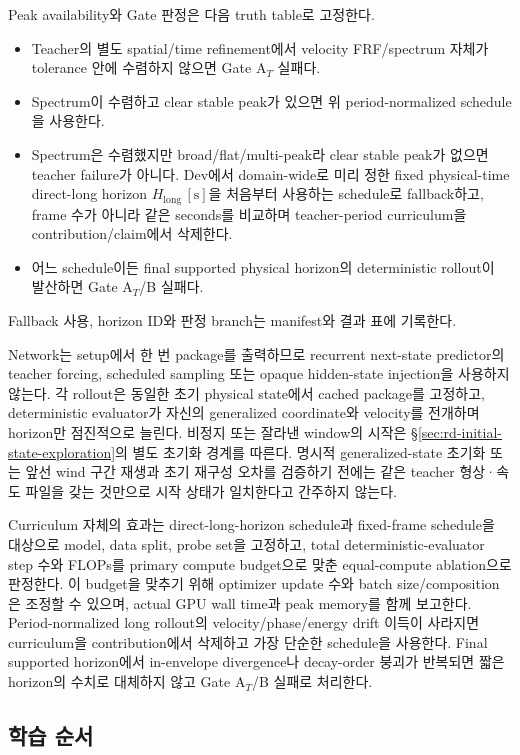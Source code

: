 \documentclass[11pt]{article}
\begin{document}
Peak availability와 Gate 판정은 다음 truth table로 고정한다.
\begin{itemize}
  \item Teacher의 별도 spatial/time refinement에서 velocity FRF/spectrum 자체가 tolerance 안에
  수렴하지 않으면 Gate A\(_T\) 실패다.
  \item Spectrum이 수렴하고 clear stable peak가 있으면 위 period-normalized schedule을 사용한다.
  \item Spectrum은 수렴했지만 broad/flat/multi-peak라 clear stable peak가 없으면 teacher failure가 아니다.
  Dev에서 domain-wide로 미리 정한 fixed physical-time direct-long horizon
  \(H_{\mathrm{long}}\,[\mathrm s]\)을 처음부터 사용하는 schedule로 fallback하고,
  frame 수가 아니라 같은 seconds를 비교하며
  teacher-period curriculum을 contribution/claim에서 삭제한다.
  \item 어느 schedule이든 final supported physical horizon의 deterministic rollout이 발산하면
  Gate A\(_T\)/B 실패다.
\end{itemize}
Fallback 사용, horizon ID와 판정 branch는 manifest와 결과 표에 기록한다.

Network는 setup에서 한 번 package를 출력하므로 recurrent next-state predictor의 teacher forcing,
scheduled sampling 또는 opaque hidden-state injection을 사용하지 않는다. 각 rollout은 동일한 초기
physical state에서 cached package를 고정하고, deterministic evaluator가 자신의 generalized coordinate와
velocity를 전개하며 horizon만 점진적으로 늘린다.
비정지 또는 잘라낸 window의 시작은 \S\ref{sec:rd-initial-state-exploration}의 별도 초기화 경계를 따른다.
명시적 generalized-state 초기화 또는 앞선 wind 구간 재생과 초기 재구성 오차를 검증하기 전에는
같은 teacher 형상·속도 파일을 갖는 것만으로 시작 상태가 일치한다고 간주하지 않는다.

Curriculum 자체의 효과는 direct-long-horizon schedule과 fixed-frame schedule을 대상으로 model, data split,
probe set을 고정하고, total deterministic-evaluator step 수와 FLOPs를 primary compute budget으로 맞춘
equal-compute ablation으로 판정한다. 이 budget을 맞추기 위해 optimizer update 수와 batch
size/composition은 조정할 수 있으며, actual GPU wall time과 peak memory를 함께 보고한다.
Period-normalized long rollout의 velocity/phase/energy drift 이득이 사라지면 curriculum을
contribution에서 삭제하고 가장 단순한 schedule을 사용한다. Final supported horizon에서 in-envelope
divergence나 decay-order 붕괴가 반복되면 짧은 horizon의 수치로 대체하지 않고 Gate A\(_T\)/B
실패로 처리한다.

\subsection{학습 순서}
\end{document}
